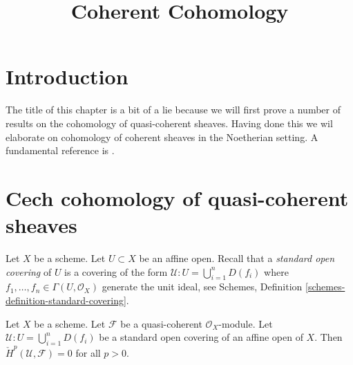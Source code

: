 

%


\title{Coherent Cohomology}


\maketitle

\label{section-phantom}

\tableofcontents

\section{Introduction}
\label{section-introduction}

\noindent
The title of this chapter is a bit of a lie because we
will first prove a number of results on the cohomology of quasi-coherent
sheaves. Having done this we wil elaborate on cohomology of
coherent sheaves in the Noetherian setting.
A fundamental reference is \cite{EGA}.







\section{Cech cohomology of quasi-coherent sheaves}
\label{section-cech-quasi-coherent}

\noindent
Let $X$ be a scheme.
Let $U \subset X$ be an affine open.
Recall that a {\it standard open covering} of $U$ is a covering
of the form $\mathcal{U} : U = \bigcup_{i = 1}^n D(f_i)$
where $f_1, \ldots, f_n \in \Gamma(U, \mathcal{O}_X)$ generate
the unit ideal, see
Schemes, Definition \ref{schemes-definition-standard-covering}.

\begin{lemma}
\label{lemma-cech-cohomology-quasi-coherent-trivial}
Let $X$ be a scheme.
Let $\mathcal{F}$ be a quasi-coherent $\mathcal{O}_X$-module.
Let $\mathcal{U} : U = \bigcup_{i = 1}^n D(f_i)$ be a standard
open covering of an affine open of $X$.
Then $\check{H}^p(\mathcal{U}, \mathcal{F}) = 0$ for
all $p > 0$.
\end{lemma}

